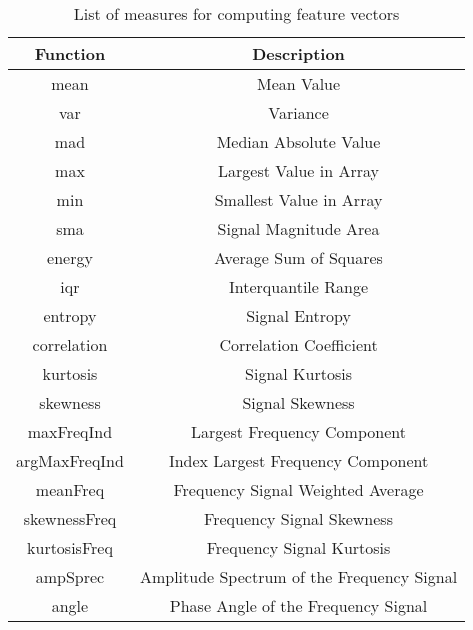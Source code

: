 \begin{table}[H]
    \centering
    \begin{tabular}{|c|c|}
    \hline
    \textbf{Function} & \textbf{Description} \\
    \hline
    mean & Mean Value \\
    var & Variance \\
    mad & Median Absolute Value \\
    max & Largest Value in Array \\
    min & Smallest Value in Array \\
    sma & Signal Magnitude Area \\
    energy & Average Sum of Squares \\
    iqr & Interquantile Range \\
    entropy & Signal Entropy \\
    correlation & Correlation Coefficient \\
    kurtosis & Signal Kurtosis \\
    skewness & Signal Skewness \\
    maxFreqInd & Largest Frequency Component \\
    argMaxFreqInd & Index Largest Frequency Component \\
    meanFreq & Frequency Signal Weighted Average \\
    skewnessFreq & Frequency Signal Skewness \\
    kurtosisFreq & Frequency Signal Kurtosis \\
    ampSprec & Amplitude Spectrum of the Frequency Signal \\
    angle & Phase Angle of the Frequency Signal \\
    \hline
    \end{tabular}
    \caption{List of measures for computing feature vectors}
\label{tab:ml_features}
\end{table}
